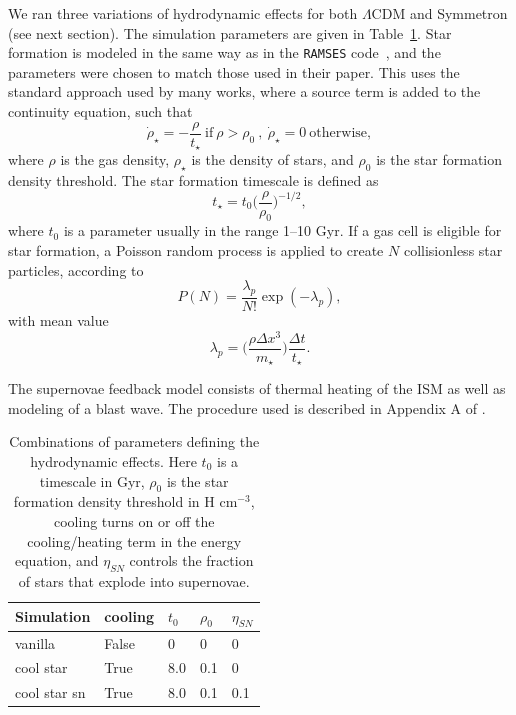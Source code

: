 \documentclass{aa}
\begin{document}
We ran three variations of hydrodynamic effects for both $\Lambda$CDM and Symmetron (see next section). The simulation parameters are given in Table~\ref{tab:hydro_params}.
Star formation is modeled in the same way as in the \texttt{RAMSES} code~\citep{dubois2008onset}, and the parameters were chosen to match those used in their paper. This uses the standard approach used by many works, where  a source term is added to the continuity equation, such that
\begin{equation}
\dot{\rho}_\star =  -\frac{\rho}{t_\star} ~\mathrm{if}~ \rho > \rho_0~,~ \dot{\rho}_\star =  0 ~ \mathrm{otherwise,}
\end{equation}
where $\rho$ is the gas density, $\rho_\star$ is the density of stars, and $\rho_0$ is the star formation density threshold.
The star formation timescale  is defined as
\begin{equation}
t_\star = t_0\bigg(\frac{\rho}{\rho_0}\bigg)^{-1/2},
\end{equation}
where $t_0$ is a parameter usually in the range 1--10 Gyr. If a gas cell is eligible for star formation, a Poisson random process is applied to create $N$ collisionless star particles, according to
\begin{equation}
P(N) = \frac{\lambda_p}{N!}\exp(-\lambda_p),
\end{equation}
with mean value
\begin{equation}
\lambda_p = \bigg(\frac{\rho\Delta x^3}{m_\star}\bigg)\frac{\Delta t}{t_\star}.
\end{equation}

The supernovae feedback model consists of thermal heating of the ISM as well as modeling of a blast wave. The procedure used is described in Appendix A of \citet{dubois2008onset}.

\begin{table}
        \centering
\caption{Combinations of parameters defining the hydrodynamic effects. Here $t_0$ is a timescale in Gyr, $\rho_0$ is the star formation density threshold in H $\mathrm{cm^{-3}}$, cooling turns on or off the cooling/heating term in the energy equation, and $\eta_{SN}$ controls the fraction of stars that explode into supernovae.}
    \label{tab:hydro_params}
    \begin{tabular}{l l l l l}
    Simulation  & cooling &$t_0$ & $\rho_0$ & $\eta_{SN}$\\
    \hline
    vanilla      &      False    & 0  &0  &0   \\
    cool star    &      True     & 8.0&0.1&0   \\
    cool star sn &      True     & 8.0&0.1&0.1 \\
    \hline
        \end{tabular}
\end{table}
\end{document}
